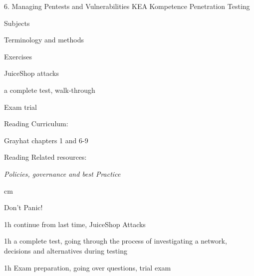 \documentclass[Screen16to9,17pt]{foils}
\begin{document}
\mytitlepage
{6. Managing Pentests and Vulnerabilities}
{KEA Kompetence Penetration Testing}





\begin{list1}
\item Subjects
\begin{list2}
\item Terminology and methods

\end{list2}
\item Exercises
\begin{list2}
\item JuiceShop attacks
\item a complete test, walk-through
\item Exam trial
\end{list2}
\item  Reading Curriculum:
\begin{list2}
\item Grayhat chapters 1 and 6-9
\end{list2}
\item  Reading Related resources:
\begin{list2}
\item \emph{Policies, governance and best Practice}
\end{list2}
\end{list1}



 cm

\centerline{\color{titlecolor}\LARGE Don't Panic!}


\begin{list1}
\item 1h continue from last time, JuiceShop Attacks
\item 1h a complete test, going through the process of investigating a network, decisions and alternatives during testing
\item 1h Exam preparation, going over questions, trial exam
\end{list1}





\end{document}

